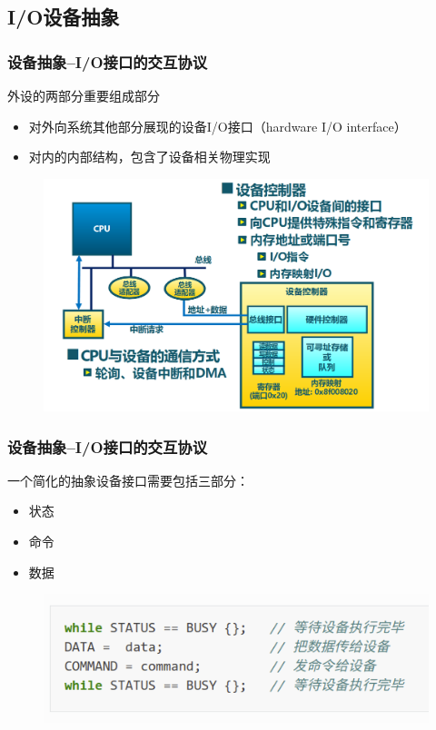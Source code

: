 \subsection{I/O设备抽象} %
\begin{frame}[fragile]
    \frametitle{设备抽象--I/O接口的交互协议}
    外设的两部分重要组成部分
    \begin{itemize}
        \item 对外向系统其他部分展现的设备I/O接口（hardware I/O interface）
        \item 对内的内部结构，包含了设备相关物理实现
    \end{itemize}
    \begin{figure}
    \includegraphics[width=0.5\linewidth]{figs/cpu-connect-dev.png}
\end{figure}
\end{frame}

\begin{frame}[fragile]
    \frametitle{设备抽象--I/O接口的交互协议}
    一个简化的抽象设备接口需要包括三部分：
    \begin{itemize}
        \item 状态
        \item 命令
        \item 数据
    \end{itemize}
    \begin{figure}
        \includegraphics[width=0.7\linewidth]{figs/simple-io-interface.png}
    \end{figure}
\end{frame}

